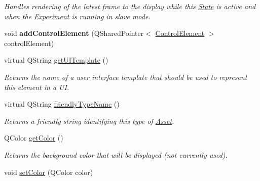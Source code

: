 \begin{DoxyCompactItemize}
\begin{DoxyCompactList}\small\item\em Handles rendering of the latest frame to the display while this \hyperlink{class_picto_1_1_state}{State} is active and when the \hyperlink{class_picto_1_1_experiment}{Experiment} is running in slave mode. \end{DoxyCompactList}\item 
\hypertarget{class_picto_1_1_state_a10af36489d4cde3c68559c6b10ecbd9e}{void {\bfseries add\-Control\-Element} (Q\-Shared\-Pointer$<$ \hyperlink{class_picto_1_1_control_element}{Control\-Element} $>$ control\-Element)}\label{class_picto_1_1_state_a10af36489d4cde3c68559c6b10ecbd9e}

\item 
\hypertarget{class_picto_1_1_state_a53e9660a9099bfbc74bf9c52da6f586d}{virtual Q\-String \hyperlink{class_picto_1_1_state_a53e9660a9099bfbc74bf9c52da6f586d}{get\-U\-I\-Template} ()}\label{class_picto_1_1_state_a53e9660a9099bfbc74bf9c52da6f586d}

\begin{DoxyCompactList}\small\item\em Returns the name of a user interface template that should be used to represent this element in a U\-I. \end{DoxyCompactList}\item 
virtual Q\-String \hyperlink{class_picto_1_1_state_a852150ca9027d53252cd0cefb04f3c1d}{friendly\-Type\-Name} ()
\begin{DoxyCompactList}\small\item\em Returns a friendly string identifying this type of \hyperlink{class_picto_1_1_asset}{Asset}. \end{DoxyCompactList}\item 
\hypertarget{class_picto_1_1_state_a77d58a1cc415d1776d31379556042b51}{Q\-Color \hyperlink{class_picto_1_1_state_a77d58a1cc415d1776d31379556042b51}{get\-Color} ()}\label{class_picto_1_1_state_a77d58a1cc415d1776d31379556042b51}

\begin{DoxyCompactList}\small\item\em Returns the background color that will be displayed (not currently used). \end{DoxyCompactList}\item 
\hypertarget{class_picto_1_1_state_a7407c4c6836c50a5589cd855018d339e}{void \hyperlink{class_picto_1_1_state_a7407c4c6836c50a5589cd855018d339e}{set\-Color} (Q\-Color color)}\label{class_picto_1_1_state_a7407c4c6836c50a5589cd855018d339e}


\end{DoxyCompactItemize}
